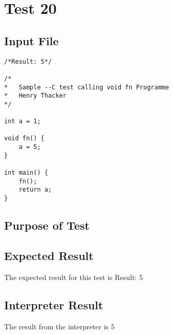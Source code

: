 \section{Test 20}
\subsection{Input File}
\begin{verbatim}
/*Result: 5*/

/*
*	Sample --C test calling void fn Programme
*	Henry Thacker
*/

int a = 1;

void fn() {
	a = 5;
}

int main() {
	fn();
	return a;
}\end{verbatim}\subsection{Purpose of Test}

\subsection{Expected Result}
The expected result for this test is Result: 5
\subsection{Interpreter Result}
The result from the interpreter is 5
